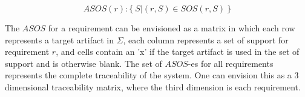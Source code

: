 $$ ASOS(r) : \{\ S | (r,S) \in SOS(r,S)\ \} $$

The $ASOS$ for a requirement can be envisioned as a matrix in which each row represents a target artifact in $\Sigma$, each column represents a set of support for requirement $r$, and cells contain an 'x' if the target artifact is used in the set of support and is otherwise blank.
%
The set of $ASOS$-es for all requirements represents the complete traceability of the system. One can envision this as a 3 dimensional traceability matrix, where the third dimension is each requirement.




%
%
%
%
%

